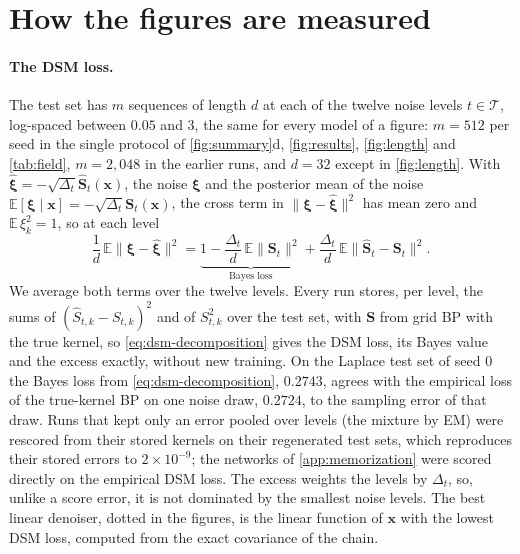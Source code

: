 \documentclass{article}
\begin{document}



\newpage
\appendix
\onecolumn
\let\appendixsection\section
\renewcommand{\section}{\FloatBarrier\appendixsection}
\section{How the figures are measured}
\label{app:measures}

\paragraph{The DSM loss.} The test set has $m$ sequences of length $d$ at each of the twelve noise levels
$t\in\mathcal T$, log-spaced between $0.05$ and $3$, the same for every model of a figure: $m=512$ per seed in the
single protocol of \cref{fig:summary}d, \cref{fig:results}, \cref{fig:length} and \cref{tab:field}, $m=2{,}048$ in the
earlier runs, and $d=32$ except in \cref{fig:length}. With $\widehat{\boldsymbol\xi}=
-\sqrt{\Delta_t}\widehat{\mathbf S}_t(\mathbf x)$, the noise $\boldsymbol\xi$ and the posterior mean of the noise
$\mathbb E[\boldsymbol\xi\mid\mathbf x]=-\sqrt{\Delta_t}\mathbf S_t(\mathbf x)$, the cross term in
$\|\boldsymbol\xi-\widehat{\boldsymbol\xi}\|^2$ has mean zero and $\mathbb E\,\xi_k^2=1$, so at each level
\begin{equation}
  \frac1d\,\mathbb E\|\boldsymbol\xi-\widehat{\boldsymbol\xi}\|^2
  =\underbrace{1-\frac{\Delta_t}{d}\,\mathbb E\|\mathbf S_t\|^2}_{\text{Bayes loss}}
  +\frac{\Delta_t}{d}\,\mathbb E\|\widehat{\mathbf S}_t-\mathbf S_t\|^2 .
  \label{eq:dsm-decomposition}
\end{equation}
We average both terms over the twelve levels. Every run stores, per level, the sums of $(\widehat S_{t,k}-S_{t,k})^2$
and of $S_{t,k}^2$ over the test set, with $\mathbf S$ from grid BP with the true kernel, so \cref{eq:dsm-decomposition}
gives the DSM loss, its Bayes value and the excess exactly, without new training. On the Laplace test set of seed 0 the
Bayes loss from \cref{eq:dsm-decomposition}, $0.2743$, agrees with the empirical loss of the true-kernel BP on one noise
draw, $0.2724$, to the sampling error of that draw. Runs that kept only an error pooled over levels (the mixture by EM)
were rescored from their stored kernels on their regenerated test sets, which reproduces their stored errors to
$2\times10^{-9}$;
the networks of \cref{app:memorization} were scored directly on the empirical DSM loss. The excess weights the levels by
$\Delta_t$, so, unlike a score error, it is not dominated by the smallest noise levels. The best linear denoiser,
dotted in the figures, is the linear function of $\mathbf x$ with the lowest DSM loss, computed from the exact covariance
of the chain.
\end{document}
